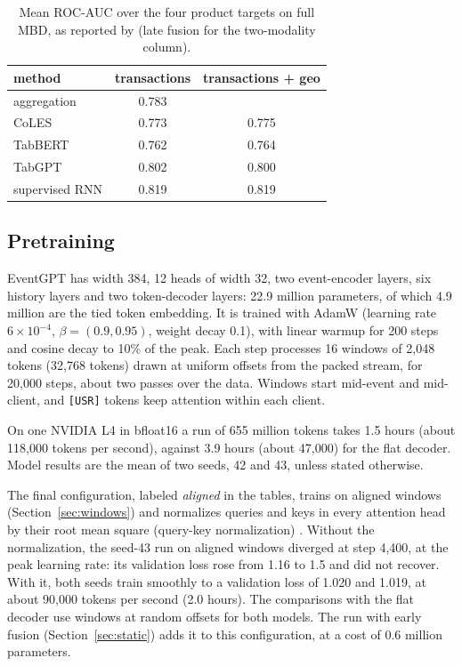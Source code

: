 \documentclass[12pt]{article}
\newcommand{\tok}[1]{\texttt{#1}}
\begin{document}
\begin{table}[htbp]
\centering
\caption{Mean ROC-AUC over the four product targets on full MBD, as reported by \cite{mbd} (late fusion for the two-modality column).}
\label{tab:published}
\begin{tabular}{lcc}
\toprule
method & transactions & transactions + geo \\
\midrule
aggregation & 0.783 & \\
CoLES & 0.773 & 0.775 \\
TabBERT & 0.762 & 0.764 \\
TabGPT & 0.802 & 0.800 \\
supervised RNN & 0.819 & 0.819 \\
\bottomrule
\end{tabular}
\end{table}

\subsection{Pretraining}

EventGPT has width 384, 12 heads of width 32, two event-encoder layers, six history layers and two token-decoder layers: 22.9 million parameters, of which 4.9 million are the tied token embedding. It is trained with AdamW (learning rate $6 \times 10^{-4}$, $\beta = (0.9, 0.95)$, weight decay 0.1), with linear warmup for 200 steps and cosine decay to 10\% of the peak. Each step processes 16 windows of 2,048 tokens (32,768 tokens) drawn at uniform offsets from the packed stream, for 20,000 steps, about two passes over the data. Windows start mid-event and mid-client, and \tok{[USR]} tokens keep attention within each client.

On one NVIDIA L4 in bfloat16 a run of 655 million tokens takes 1.5 hours (about 118,000 tokens per second), against 3.9 hours (about 47,000) for the flat decoder. Model results are the mean of two seeds, 42 and 43, unless stated otherwise.

The final configuration, labeled \emph{aligned} in the tables, trains on aligned windows (Section~\ref{sec:windows}) and normalizes queries and keys in every attention head by their root mean square (query-key normalization) \cite{qknorm}. Without the normalization, the seed-43 run on aligned windows diverged at step 4,400, at the peak learning rate: its validation loss rose from 1.16 to 1.5 and did not recover. With it, both seeds train smoothly to a validation loss of 1.020 and 1.019, at about 90,000 tokens per second (2.0 hours). The comparisons with the flat decoder use windows at random offsets for both models. The run with early fusion (Section~\ref{sec:static}) adds it to this configuration, at a cost of 0.6 million parameters.
\end{document}
